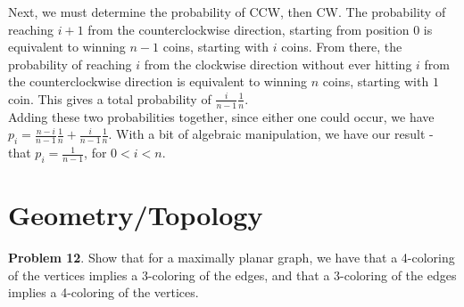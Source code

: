 \documentclass[a4paper]{article}
\begin{document}
Next, we must determine the probability of CCW, then CW. The probability of reaching $i+1$ from the counterclockwise direction, starting from position $0$ is equivalent to winning $n-1$ coins, starting with $i$ coins. From there, the probability of reaching $i$ from the clockwise direction without ever hitting $i$ from the counterclockwise direction is equivalent to winning $n$ coins, starting with $1$ coin. This gives a total probability of $\frac{i}{n-1}\frac{1}{n}$. \\

Adding these two probabilities together, since either one could occur, we have $p_i = \frac{n-i}{n-1}\frac{1}{n} + \frac{i}{n-1}\frac{1}{n}$. With a bit of algebraic manipulation, we have our result - that $p_i = \frac{1}{n-1}$, for $0 < i < n$.

\section{Geometry/Topology}

\textbf{Problem 12}. Show that for a maximally planar graph, we have that a 4-coloring of the vertices implies a 3-coloring of the edges, and that a 3-coloring of the edges implies a 4-coloring of the vertices.
\end{document}
